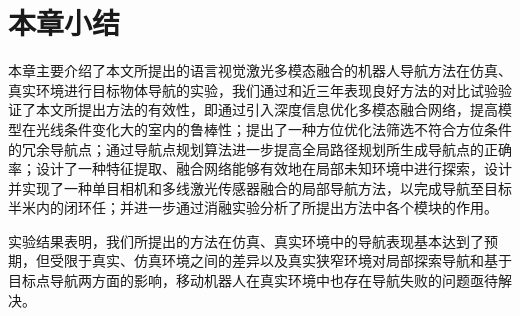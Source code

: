 \section{本章小结}

本章主要介绍了本文所提出的语言视觉激光多模态融合的机器人导航方法在仿真、真实环境进行目标物体导航的实验，我们通过和近三年表现良好方法的对比试验验证了本文所提出方法的有效性，即通过引入深度信息优化多模态融合网络，提高模型在光线条件变化大的室内的鲁棒性；提出了一种方位优化法筛选不符合方位条件的冗余导航点；通过导航点规划算法进一步提高全局路径规划所生成导航点的正确率；设计了一种特征提取、融合网络能够有效地在局部未知环境中进行探索，设计并实现了一种单目相机和多线激光传感器融合的局部导航方法，以完成导航至目标半米内的闭环任；并进一步通过消融实验分析了所提出方法中各个模块的作用。

实验结果表明，我们所提出的方法在仿真、真实环境中的导航表现基本达到了预期，但受限于真实、仿真环境之间的差异以及真实狭窄环境对局部探索导航和基于目标点导航两方面的影响，移动机器人在真实环境中也存在导航失败的问题亟待解决。